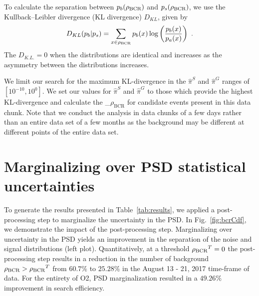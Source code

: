 \documentclass[
 nofootinbib,
 amsmath,amssymb,
 aps,
 twocolumn,
 superscriptaddress
]{revtex4-2}
\newcommand{\mathcmd}[1]{{\sc \relax\ifmmode#1\else $#1$\fi}\xspace}
\newcommand{\bcr}{\mathcmd{\rho_\text{BCR}}}
\begin{document}
To calculate the separation between $p_b(\bcr)$ and $p_s(\bcr)$, we use the Kullback--Leibler divergence (KL divergence) $D_{KL}$, given by
\begin{equation}
    D_{KL}(p_b | p_s) = \sum\limits_{x\in \bcr} p_b(x) \log \left( \frac{p_b(x)}{p_a(x)} \right)  \ .
\end{equation}
The $D_{K.L.}=0$ when the distributions are identical and increases as the asymmetry between the distributions increases. 

We limit our search for the maximum KL-divergence in the $\hat{\pi}^S$ and $\hat{\pi}^G$ ranges of $[10^{-10}, 10^0]$. We set our values for $\hat{\pi}^S$ and $\hat{\pi}^G$ to those which provide the highest KL-divergence and calculate the \bcr for candidate events present in this data chunk. Note that we conduct the analysis in data chunks of a few days rather than an entire data set of a few months as the background may be different at different points of the entire data set.






\section{Marginalizing over PSD statistical uncertainties}\label{sec:psd-marginalization}
To generate the results presented in Table~\ref{tab:results}, we applied a post-processing step to marginalize the uncertainty in the PSD. In Fig.~\ref{fig:bcrCdf}, we demonstrate the impact of the post-processing step. Marginalizing over uncertainty in the PSD yields an improvement in the separation of the noise and signal distributions (left plot). Quantitatively, at a threshold $\bcr^T=0$ the post-processing step results in a reduction in the number of background $\bcr > \bcr^T$ from $60.7\%$ to $25.28\%$ in the August 13 - 21, 2017 time-frame of data. For the entirety of O2, PSD marginalization resulted in a $49.26\%$ improvement in search efficiency. 
\end{document}
